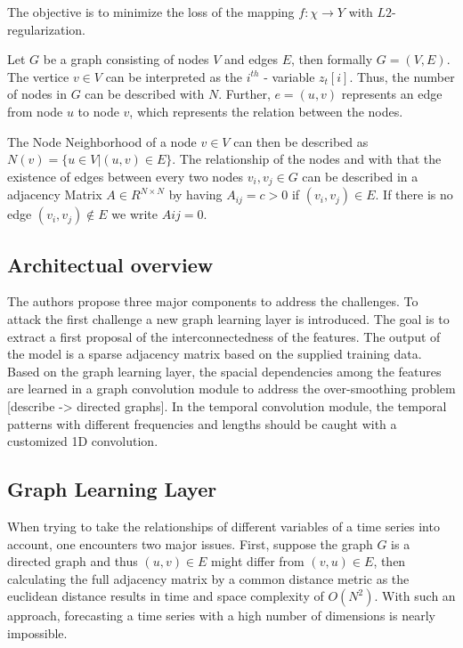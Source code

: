 \documentclass[letterpaper,twocolumn,11pt]{article}
\begin{document}
    The objective is to minimize the loss of the mapping $f: \chi \rightarrow Y$ with $L2$-regularization.

    Let $G$ be a graph consisting of nodes $V$ and edges $E$, then formally $G=(V, E)$. The vertice $v \in V$ can be
    interpreted as the $i^{th}$ - variable $z_t[i]$. Thus, the number of nodes in $G$ can be described with $N$.
    Further, $e = (u,v)$ represents an edge from node $u$ to node $v$, which represents the relation between the nodes.

    The Node Neighborhood of a node $v \in V$ can then be described as $N(v) = \{u \in V| (u,v) \in E\}$.
    The relationship of the nodes and with that the existence of edges between every two nodes $v_i,v_j \in G$
    can be described in a adjacency Matrix $A \in R^{N\times N}$ by
    having  $A_{ij} = c > 0$ if $(v_i,v_j) \in E$. If there is no edge $(v_i,v_j) \notin E$ we write $Aij = 0$.

    \subsection{Architectual overview}
    The authors propose three major components to address the challenges. To attack the first challenge a new graph learning layer
    is introduced. The goal is to extract a first proposal of the interconnectedness of the features. The output of the model is a sparse adjacency matrix based on the supplied training data.
    Based on the graph learning layer, the spacial dependencies among the features are learned in a graph convolution module to address the over-smoothing problem [describe -> directed graphs].
    In the temporal convolution module, the temporal patterns with different frequencies and lengths should be caught with a customized 1D convolution.

    \subsection{Graph Learning Layer}
    When trying to take the relationships of different variables of a time series into account, one encounters two major issues.
    First, suppose the graph $G$ is a directed graph and thus $(u,v)\in E$ might differ from $(v,u)\in E$,
    then calculating the full adjacency matrix by a common distance metric as the euclidean distance results in time and space complexity of $O(N^2)$.
    With such an approach, forecasting a time series with a high number of dimensions is nearly impossible.
\end{document}
